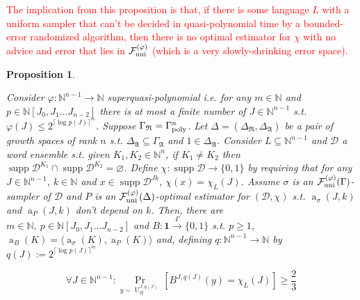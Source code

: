 \documentclass[11pt]{article}
\numberwithin{equation}{section}
\theoremstyle{definition}
\theoremstyle{plain}
\newtheorem{proposition}{Proposition}[section]
\newcommand{\Bool}{\{0,1\}}
\DeclareMathOperator{\Supp}{supp}
\DeclareMathOperator{\Prb}{Pr}
\DeclareMathOperator{\A}{a}
\DeclareMathOperator{\Un}{U}
\newcommand{\Nats}{\mathbb{N}}
\newcommand{\NatPolyJ}{\Nats[J_0, J_1 \ldots J_{n-2}]}
\newcommand{\Ceil}[1]{\lceil #1 \rceil}
\newcommand{\Chev}[1]{\langle #1 \rangle}
\newcommand{\Dist}{\mathcal{D}}
\newcommand{\GrowR}{\Gamma_{\mathfrak{R}}}
\newcommand{\GrowA}{\Gamma_{\mathfrak{A}}}
\newcommand{\Fall}{\mathcal{F}}
\newcommand{\GammaPoly}{\Gamma_{\textnormal{poly}}}
\newcommand{\FallUt}[1]{{\Fall_{\textnormal{uni}}^{(#1)}}}
\newcommand{\Scheme}{\xrightarrow{\Gamma}}
\begin{document}
\textcolor{red}{The implication from this proposition is that, if there is some language $L$ with a uniform sampler that can't be decided in quasi-polynomial time by a bounded-error randomized algorithm, then there is no optimal estimator for $\chi$ with no advice and error that lies in $\FallUt{\varphi}$ (which is a very slowly-shrinking error space).}

\begin{samepage}
\begin{proposition}
\label{prp:tally_fall_uni}

Consider ${\varphi: \Nats^{n-1} \rightarrow \Nats}$ superquasi-polynomial i.e. for any ${m \in \Nats}$ and\\ ${p \in \NatPolyJ}$ there is at most a finite number of ${J \in \Nats^{n-1}}$ s.t. ${\varphi(J) \leq 2^{\Ceil{\log p(J)}^m}}$. Suppose ${\GrowR  = \GammaPoly^n}$. Let ${\Delta=(\Delta_{\mathfrak{R}}, \Delta_{\mathfrak{A}})}$ be a pair of growth spaces of rank ${n}$ s.t. ${\Delta_{\mathfrak{A}} \subseteq \GrowA}$ and ${1 \in \Delta_{\mathfrak{A}}}$. Consider ${L \subseteq \Nats^{n-1}}$ and ${\Dist}$ a word ensemble s.t. given ${K_1, K_2 \in \Nats^n}$, if ${K_1 \ne K_2}$ then ${\Supp \Dist^{K_1} \cap \Supp \Dist^{K_2} = \varnothing}$. Define ${\chi: \Supp \Dist \rightarrow \Bool}$ by requiring that for any ${J \in \Nats^{n-1}}$, ${k \in \Nats}$ and ${x \in \Supp \Dist^{Jk}}$, ${\chi(x)=\chi_L(J)}$. Assume ${\sigma}$ is an ${\FallUt{\varphi}(\Gamma)}$-sampler of ${\Dist}$ and ${P}$ is an ${\FallUt{\varphi}(\Delta)}$-optimal estimator for ${(\Dist, \chi)}$ s.t. ${\A_\sigma(J,k)}$ and ${\A_P(J,k)}$ don't depend on ${k}$. Then, there are\\ $m \in \Nats$, ${p \in \NatPolyJ}$ and ${B: \bm{1} \Scheme \Bool}$ s.t. ${p \geq 1}$, ${\A_B(K)=\Chev{\A_\sigma(K),\A_P(K)}}$ and, defining ${q: \Nats^{n-1} \rightarrow \Nats}$ by ${q(J):=2^{\Ceil{\log p(J)}^m}}$

\begin{equation}
\label{eqn:prp__tally_fall_uni}
\forall J \in \Nats^{n-1}:\Prb_{y \sim \Un_B^{J,q(J)}}[B^{J,q(J)}(y)=\chi_L(J)] \geq \frac{2}{3}
\end{equation}

\end{proposition}
\end{samepage}
\end{document}
